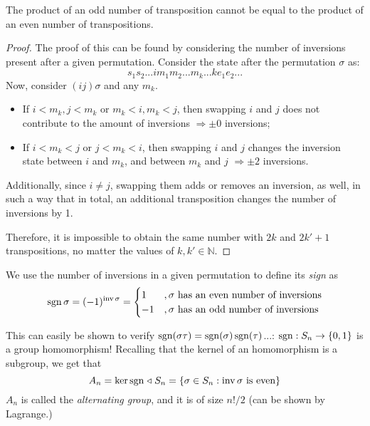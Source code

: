 \begin{theorem}
  The product of an odd number of transposition cannot be equal to the product of an even number of transpositions.
\end{theorem}
\begin{proof}
  The proof of this can be found by considering the number of inversions present after a given permutation. Consider the state after the permutation $\sigma$ as: 
  \[
    s_1s_2...im_1m_2...m_k...ke_1e_2...
  \]
  Now, consider $(ij)\sigma$ and any $m_k$. 
  \begin{itemize}
    \item If $i < m_k, j < m_k$ or $m_k < i, m_k < j$, then swapping $i$ and $j$ does not contribute to the amount of inversions $\Rightarrow \pm 0$ inversions; 
    \item If $i < m_k < j$ or $j < m_k < i$, then swapping $i$ and $j$ changes the inversion state between $i$ and $m_k$, and between $m_k$ and $j$ $\Rightarrow \pm 2$ inversions.
  \end{itemize}
  Additionally, since $i \neq j$, swapping them adds or removes an inversion, as well, in such a way that in total, an additional transposition changes the number of inversions by 1. 

  Therefore, it is impossible to obtain the same number with $2k$ and $2k' + 1$ transpositions, no matter the values of $k, k' \in \mathbb{N}$. 
\end{proof}
\begin{definition}
  We use the number of inversions in a given permutation to define its \emph{sign} as 
  \[
    \operatorname{sgn}{\sigma} = (-1)^{\operatorname{inv}\sigma} = \begin{cases}
      1 &, \sigma \text{ has an even number of inversions} \\
      -1 &, \sigma \text{ has an odd number of inversions}
    \end{cases}
  \]
\end{definition}

This can easily be shown to verify $\operatorname{sgn}(\sigma\tau) = \operatorname{sgn}(\sigma)\operatorname{sgn}(\tau)$...: $\operatorname{sgn}: S_n \to \{0, 1\}$ is a group homomorphism! Recalling that the kernel of an homomorphism is a subgroup, we get that 
\[
  A_n = \ker\operatorname{sgn} \mathrel{\triangleleft} S_n = \{\sigma \in S_n : \operatorname{inv}\sigma \text{ is even}\}
\]
$A_n$ is called the \emph{alternating group}, and it is of size $n! / 2$ (can be shown by Lagrange.)

